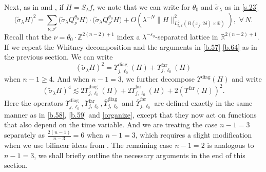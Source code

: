 \documentclass[10pt]{amsart}
\newcommand{\la}{\lambda}
\newcommand{\e}{\varepsilon}
\newcommand{\1}{{\bf 1}}
\newcommand{\R}{{\mathbb R}}
\newcommand{\diag}{\Upsilon^{\text{diag}}}
\newcommand{\far}{\Upsilon^{\text{far}}}
\begin{document}
Next, as in \cite{blair2023strichartz} and \cite{HSst}, if $H=S_\la f$, we note that we can write for $\theta_0$ and $\tilde \sigma_\la$ as in \eqref{s.23}
\begin{equation}\label{s.32}
\bigl(\tilde \sigma_\la H\bigr)^2 =
\sum_{\nu,\nu'}
\bigl(\tilde \sigma_\la Q^{\theta_0}_\nu H\bigr)\cdot 
\bigl(\tilde \sigma_\la Q^{\theta_0}_{\nu'}H\bigr) +O(\la^{-N}\|H\|^2_{L^2_{t,x}(B(x_j,2\delta)\times \R)}), \, \, \forall \, N.
\end{equation}
Recall that the $\nu=\theta_0\cdot {\mathbb Z}^{2(n-2)+1}$ index a $\la^{-\e_0}$-separated lattice in ${\mathbb R}^{2(n-2)+1}$.  
If we repeat the Whitney decomposition and the arguments in \eqref{b.57}-\eqref{b.64} as in the previous section. We can write 
\begin{equation}\label{s.33}
(\tilde \sigma_\la H)^2 = \diag_{j,\ell_0}(H) +\far_{j,\ell_0}(H)
\end{equation}
 when $n-1\ge4$. And when $n-1=3$, we further decompose $\diag(H)$ and write
 \begin{equation}\label{s.34}
(\tilde \sigma_\la H)^4\lesssim2{\overline\Upsilon_{j,\ell_0}^{\text{diag}}}(H)+2{\overline\Upsilon_{j,\ell_0}^{\text{far}}}(H)+2(\far(H))^2.
\end{equation}
 Here the operators $\diag_{j,\ell_0}, \far_{j,\ell_0}, {\overline\Upsilon_{j,\ell_0}^{\text{diag}}} $ and ${\overline\Upsilon_{j,\ell_0}^{\text{far}}}$ are defined exactly in the same manner as in \eqref{b.58}, \eqref{b.59} and \eqref{organize}, except that they now act on functions that also depend on the time variable.
 And we are treating the case $n-1=3$ separately as $\frac{2(n-1)}{n-3}=6$ when $n-1=3$, which requires a slight modification when we use bilinear ideas from \cite{TaoVargasVega}. The remaining case $n-1=2$ is analogous to $n-1=3$, we shall briefly outline the necessary arguments in the end of this section.
\end{document}
